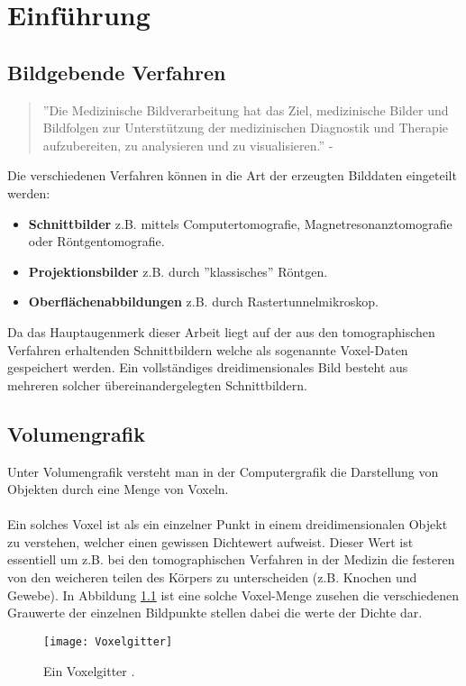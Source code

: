 \chapter{Einführung}

\section{Bildgebende Verfahren}
\begin{quote}
	''Die Medizinische Bildverarbeitung hat das Ziel, medizinische Bilder und Bildfolgen zur Unterstützung der medizinischen Diagnostik und Therapie aufzubereiten, zu analysieren und zu visualisieren.'' - \cite{MedBildVerarbeitung}
\end{quote}
Die verschiedenen Verfahren können in die Art der erzeugten Bilddaten eingeteilt werden:
\begin{itemize}
	\item \textbf{Schnittbilder} z.B. mittels Computertomografie, Magnetresonanztomografie oder Röntgentomografie.
	\item \textbf{Projektionsbilder} z.B. durch ''klassisches'' Röntgen.
	\item \textbf{Oberflächenabbildungen} z.B. durch Rastertunnelmikroskop.
\end{itemize}
Da das Hauptaugenmerk dieser Arbeit liegt auf der aus den tomographischen Verfahren erhaltenden Schnittbildern welche als sogenannte Voxel-Daten gespeichert werden. Ein vollständiges dreidimensionales Bild besteht aus mehreren solcher übereinandergelegten Schnittbildern.

\section{Volumengrafik}
Unter Volumengrafik versteht man in der Computergrafik die Darstellung von Objekten durch eine Menge von Voxeln. 
\\\\
Ein solches Voxel ist als ein einzelner Punkt in einem dreidimensionalen Objekt zu verstehen, welcher einen gewissen Dichtewert aufweist. Dieser Wert ist essentiell um z.B. bei den tomographischen Verfahren in der Medizin die festeren von den weicheren teilen des Körpers zu unterscheiden (z.B. Knochen und Gewebe). In Abbildung \ref{fig:Voxelgitter} ist eine solche Voxel-Menge zusehen die verschiedenen Grauwerte der einzelnen Bildpunkte stellen dabei die werte der Dichte dar.

\begin{figure}
	\centering
	\texttt{[image: Voxelgitter]}
	\caption{Ein Voxelgitter \cite{SeibtBak}.}
	\label{fig:Voxelgitter}
\end{figure}

